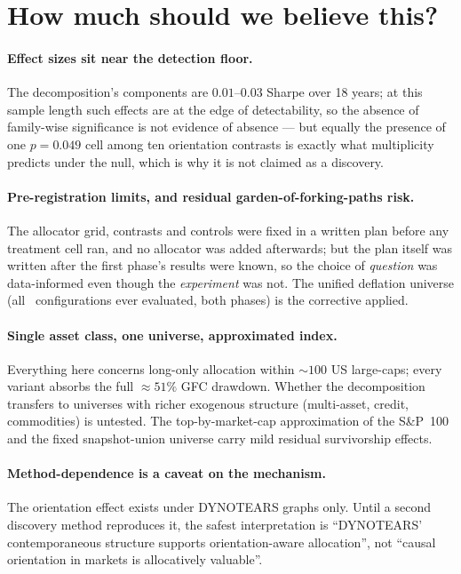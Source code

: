 \section{How much should we believe this?}
\label{sec:believe}

\paragraph{Effect sizes sit near the detection floor.} The decomposition's
components are $0.01$--$0.03$ Sharpe over 18 years; at this sample length
such effects are at the edge of detectability, so the absence of family-wise
significance is not evidence of absence --- but equally the presence of one
$p=0.049$ cell among ten orientation contrasts is exactly what multiplicity
predicts under the null, which is why it is not claimed as a discovery.

\paragraph{Pre-registration limits, and residual garden-of-forking-paths
risk.} The allocator grid, contrasts and controls were fixed in a written
plan before any treatment cell ran, and no allocator was added afterwards;
but the plan itself was written after the first phase's results were known,
so the choice of \emph{question} was data-informed even though the
\emph{experiment} was not. The unified deflation universe (all \rsNtrials\
configurations ever evaluated, both phases) is the corrective applied.

\paragraph{Single asset class, one universe, approximated index.} Everything
here concerns long-only allocation within ${\sim}100$ US large-caps; every
variant absorbs the full ${\approx}51\%$ GFC drawdown. Whether the
decomposition transfers to universes with richer exogenous structure
(multi-asset, credit, commodities) is untested. The top-by-market-cap
approximation of the S\&P~100 and the fixed snapshot-union universe carry
mild residual survivorship effects.

\paragraph{Method-dependence is a caveat on the mechanism.} The orientation
effect exists under DYNOTEARS graphs only. Until a second discovery method
reproduces it, the safest interpretation is ``DYNOTEARS' contemporaneous
structure supports orientation-aware allocation'', not ``causal orientation
in markets is allocatively valuable''.

